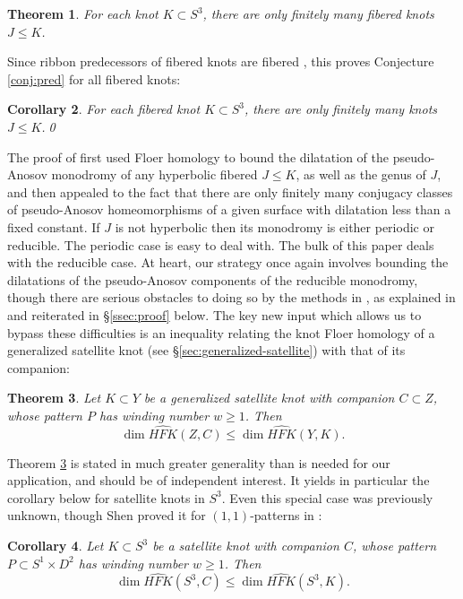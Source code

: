 \documentclass[11pt]{amsart}
\newtheorem {theorem}{Theorem}
\newtheorem {corollary}[theorem]{Corollary}
\numberwithin{equation}{section}
\numberwithin{theorem}{section}
\theoremstyle{definition}
\newcommand\HFK{\widehat{\mathit{HFK}}}
\begin{document}
\begin{theorem} \label{thm:main}
For each knot $K\subset S^3$, there are only finitely many fibered knots $J\leq K$.
\end{theorem}

Since ribbon predecessors of fibered knots are fibered \cite{silver,kochloukova}, this proves Conjecture \ref{conj:pred} for all fibered knots:

\begin{corollary}
For each fibered knot $K\subset S^3$, there are only finitely many knots $J\leq K$.\qed
\end{corollary}

The proof of \cite[Theorem 1.2]{bs-ribbon} first used Floer homology to bound the dilatation of the pseudo-Anosov monodromy of any hyperbolic fibered $J\leq K$, as well as the genus of $J$, and then appealed to the fact that there are only finitely many conjugacy classes of pseudo-Anosov homeomorphisms of a given surface with dilatation less than a fixed constant. If $J$ is not hyperbolic then its monodromy is either periodic or reducible. The periodic case is easy to deal with. The bulk of this paper deals with the reducible case. At heart, our strategy once again involves bounding the dilatations of the pseudo-Anosov components of the reducible monodromy, though there are serious obstacles to doing so by the methods in \cite{bs-ribbon}, as explained in \cite[\S 3]{bs-ribbon} and reiterated in \S\ref{ssec:proof} below. The key new input which allows us to bypass these difficulties is an inequality relating the knot Floer homology of a generalized satellite knot (see \S\ref{sec:generalized-satellite}) with that of its companion:

\begin{theorem}
\label{thm:gensat} Let $K\subset Y$ be a generalized satellite knot with companion $C \subset Z$, whose pattern $P$ has winding number $w\geq 1$. Then \[\dim\HFK(Z,C)\leq \dim\HFK(Y,K).\]
\end{theorem}

Theorem \ref{thm:gensat} is stated in much greater generality than is needed for our application, and should be of independent interest. It yields in particular the corollary below for satellite knots in $S^3$. Even this special case was previously unknown, though Shen proved it for $(1,1)$-patterns in \cite{shen-satellite}:

\begin{corollary}
\label{cor:simplesatellite}
Let $K\subset S^3$ be a  satellite knot with companion $C$, whose pattern $P\subset S^1\times D^2$ has winding number $w\geq 1$. Then \[\dim\HFK(S^3,C)\leq \dim\HFK(S^3,K).\]
\end{corollary}
\end{document}
